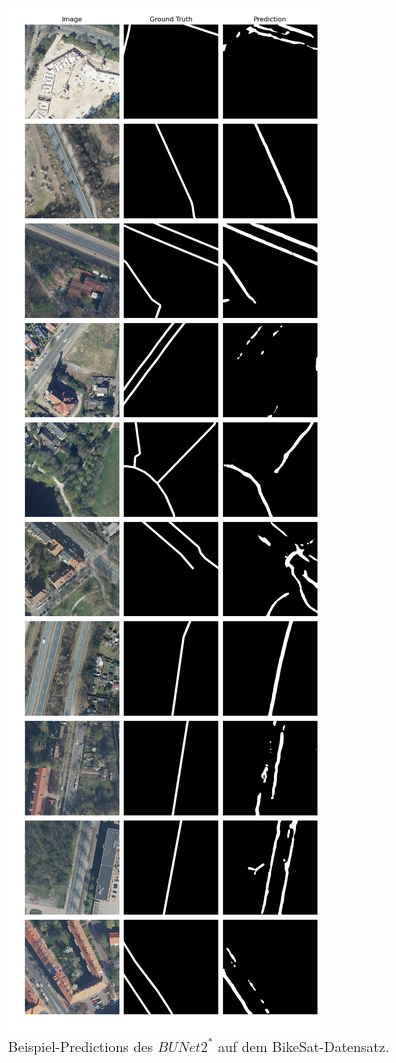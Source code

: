 \begin{figure}
	\centering
	\includegraphics[width=.41\textwidth]{Bilder/Samples-BikeSat/bunet2-s.png} 
	\caption{Beispiel-Predictions des $BUNet2^*$ auf dem BikeSat-Datensatz.}
	\label{fig:bikesat-samples-bunet2-s}
\end{figure}

